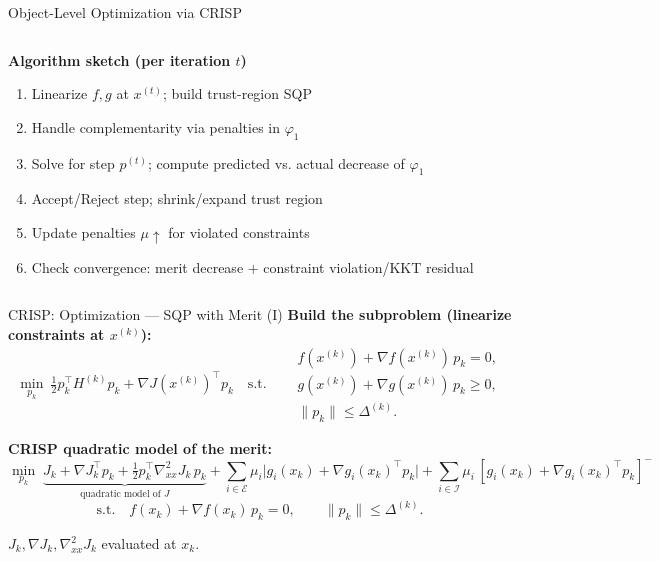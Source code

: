 \documentclass[10pt, aspectratio=169]{beamer}
\begin{document}
\begin{frame}{Object-Level Optimization via CRISP\,\footnotemark[1]}
\begin{columns}[T,onlytextwidth]
\begin{column}{0.54\textwidth}
      \textbf{Algorithm sketch (per iteration $t$)}
      \begin{enumerate}\setlength{\itemsep}{0.15em}
        \item Linearize $f,g$ at $x^{(t)}$; build trust-region SQP
        \item Handle complementarity via penalties in $\varphi_1$
        \item Solve for step $p^{(t)}$; compute predicted vs. actual decrease of $\varphi_1$
        \item Accept/Reject step; shrink/expand trust region
        \item Update penalties $\mu \uparrow$ for violated constraints 
        \item Check convergence: merit decrease + constraint violation/KKT residual
      \end{enumerate}
    \end{column}
  \end{columns}

  
\end{frame}

\begin{frame}{CRISP: Optimization — SQP with Merit (I)}
  \small
  \textbf{Build the subproblem (linearize constraints at $x^{(k)}$):}
  \[
    \min_{p_k}\ \tfrac12 p_k^\top H^{(k)} p_k + \nabla J(x^{(k)})^\top p_k
    \quad\text{s.t.}\quad
    \begin{aligned}
      &f(x^{(k)})+\nabla f(x^{(k)})\,p_k=0,\\
      &g(x^{(k)})+\nabla g(x^{(k)})\,p_k\ge 0,\\
      &\|p_k\|\le \Delta^{(k)}.
    \end{aligned}
  \]

  \textbf{CRISP quadratic model of the merit:}
  \[
    \min_{p_k}\; \underbrace{J_k+\nabla J_k^\top p_k+\tfrac12 p_k^\top \nabla^2_{xx}J_k\,p_k}_{\text{quadratic model of }J}
    +\!\!\sum_{i\in\mathcal E}\!\mu_i\big|g_i(x_k)+\nabla g_i(x_k)^\top p_k\big|
    +\!\!\sum_{i\in\mathcal I}\!\mu_i\,[g_i(x_k)+\nabla g_i(x_k)^\top p_k]^{-}
  \]
  \[
    \text{s.t.}\quad f(x_k)+\nabla f(x_k)\,p_k=0,\qquad \|p_k\|\le \Delta^{(k)}.
  \]

  \vspace{0.2em}
  {\footnotesize $J_k,\nabla J_k,\nabla^2_{xx}J_k$ evaluated at $x_k$.}
\end{frame}
\end{document}
